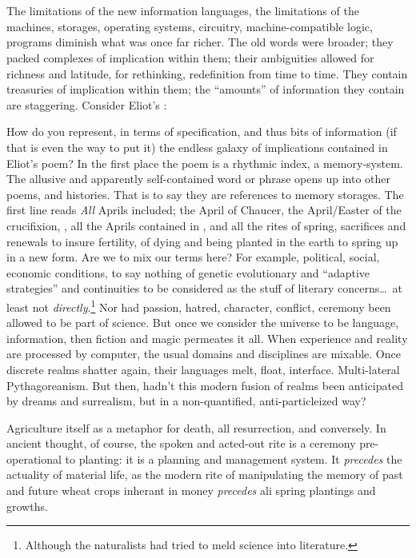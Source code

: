 \chapter{}

The limitations of the new information
languages, the limitations of the machines,
storages, operating systems, circuitry, machine-compatible logic, programs diminish
what was once far richer. The old words
were broader; they packed complexes of
implication within them; their ambiguities
allowed for richness and latitude, for rethinking, redefinition from time to time.
They contain treasuries of implication within them; the \enquote{amounts} of information they
contain are staggering. Consider Eliot's :

How do you represent, in terms of specification, and thus bits of information (if that
is even the way to put it) the endless galaxy of implications contained in Eliot's poem?
In the first place the poem is a rhythmic index, a memory-system. The allusive and
apparently self-contained word or phrase opens up into other poems, and histories.
That is to say they are references to memory
storages. The first line reads  
\emph{All} Aprils included;
the April of Chaucer, the April/Easter of the
crucifixion, , all the
Aprils contained in , and
all the rites of spring, sacrifices and renewals
to insure fertility, of dying and being planted
in the earth to spring up in a new form. Are
we to mix our terms here? For example,
political, social, economic conditions, to say
nothing of genetic evolutionary and \enquote{adaptive strategies} 
and continuities to be considered as the stuff of literary concerns\ldots\ at
least not \emph{directly}.\footnote{Although the naturalists had tried to meld science into literature.}
Nor had passion, hatred, character, conflict,
ceremony been allowed to be part of science.
But once we consider the universe to be
language, information, then fiction and
magic permeates it all. When experience and
reality are processed by computer, the usual
domains and disciplines are mixable. Once
discrete realms shatter again, their languages
melt, float, interface. Multi-lateral Pythagoreanism. But then, hadn't this modern fusion
of realms been anticipated by dreams and surrealism,
but in a non-quantified, anti-particleized way?

Agriculture itself as a metaphor for death,
all resurrection, and conversely. In ancient
thought, of course, the spoken and acted-out
rite is a ceremony pre-operational to planting: it is a planning and management 
system. It \emph{precedes} the actuality of material life, as the modern rite of manipulating the memory of past and future wheat crops inherant
in money \emph{precedes} ali spring plantings and
growths.

